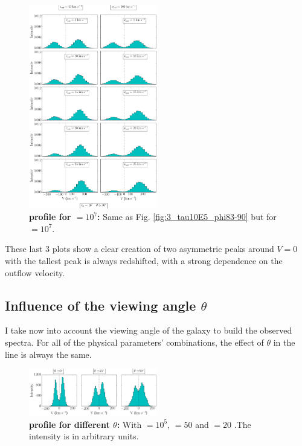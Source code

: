 \documentclass{latex/emulateapj}
\begin{document}
\newpage

\begin{figure}[h!]
	\begin{center}
		\includegraphics[width=0.5\textwidth]{./figures/3_tau10E7_phi83-90}
	\end{center}
	\caption{\textbf{\lya profile for \tauh$=10^7$:} Same as Fig. \ref{fig:3_tau10E5_phi83-90} but for \tauh$=10^7$.
		\label{fig:3_tau10E7_phi83-90}}
\end{figure}

\newpage

These last 3 plots show a clear creation of two asymmetric peaks around $V=0$ \kms with the tallest peak is always redshifted, with a strong dependence on the outflow velocity.\\

\subsection{Influence of the viewing angle $\theta$}
I take now into account the viewing angle of the galaxy to build the observed spectra. For all of the physical parameters' combinations, the effect of $\theta$ in the \lya line is always the same.\\

\begin{figure}[h!]
	\begin{center}
		\includegraphics[width=0.5\textwidth]{./figures/influence_viewing_angle_5}
	\end{center}
	\caption{\textbf{\lya profile for different $\theta$:} With \tauh$=10^5$, \vrot$=50$ \kms and \vout$=20$ \kms.The intensity is in arbitrary units.
		\label{fig:influence_viewing_angle_5}}
\end{figure}
\end{document}
